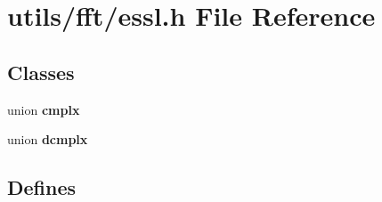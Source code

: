 \section{utils/fft/essl.h File Reference}
\label{essl_8h}
\subsection*{Classes}
\begin{CompactItemize}
\item 
union {\bf cmplx}
\item 
union {\bf dcmplx}
\end{CompactItemize}
\subsection*{Defines}
